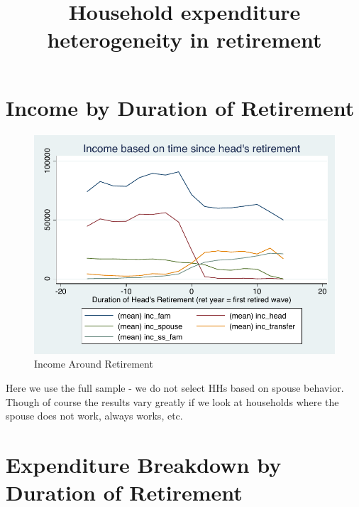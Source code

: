 \documentclass[a4paper]{article}
\begin{document}
	
	\title{Household expenditure heterogeneity in retirement}
	\date{}
	\maketitle

\section{Income by Duration of Retirement}

\begin{figure}[h]
	\caption{Income Around Retirement}
	\centering
	\includegraphics[width=1.0\textwidth]{../IncomeAroundRetirement/Income_with_spouse_definition_1.pdf}
\end{figure}

Here we use the full sample - we do not select HHs based on spouse behavior. Though of course the results vary greatly if we look at households where the spouse does not work, always works, etc. 

\clearpage

\section{Expenditure Breakdown by Duration of Retirement}
\end{document}
